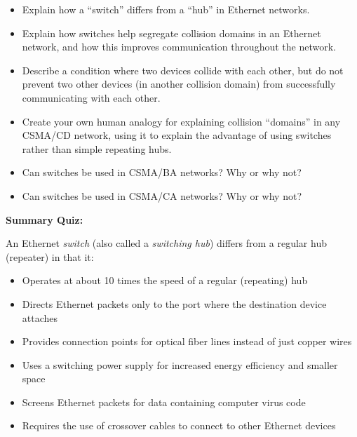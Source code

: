\begin{itemize}
\item{} Explain how a ``switch'' differs from a ``hub'' in Ethernet networks.
\item{} Explain how switches help segregate collision domains in an Ethernet network, and how this improves communication throughout the network.
\item{} Describe a condition where two devices collide with each other, but do not prevent two other devices (in another collision domain) from successfully communicating with each other.
\item{} Create your own human analogy for explaining collision ``domains'' in any CSMA/CD network, using it to explain the advantage of using switches rather than simple repeating hubs.
\item{} Can switches be used in CSMA/BA networks?  Why or why not?
\item{} Can switches be used in CSMA/CA networks?  Why or why not?
\end{itemize}










\vfil \eject

\noindent
{\bf Summary Quiz:}

An Ethernet {\it switch} (also called a {\it switching hub}) differs from a regular hub (repeater) in that it:

\begin{itemize}
\item{} Operates at about 10 times the speed of a regular (repeating) hub
\vskip 5pt 
\item{} Directs Ethernet packets only to the port where the destination device attaches
\vskip 5pt 
\item{} Provides connection points for optical fiber lines instead of just copper wires
\vskip 5pt 
\item{} Uses a switching power supply for increased energy efficiency and smaller space
\vskip 5pt 
\item{} Screens Ethernet packets for data containing computer virus code
\vskip 5pt 
\item{} Requires the use of crossover cables to connect to other Ethernet devices
\end{itemize}




